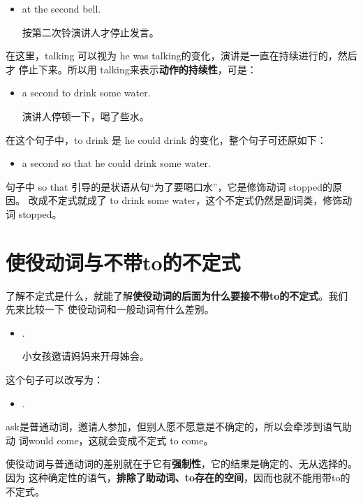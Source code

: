 \begin{itemize}
\item {}   at the second bell.

  按第二次铃演讲人才停止发言。
\end{itemize}
在这里，talking 可以视为 he was talking的变化，演讲是一直在持续进行的，然后才
停止下来。所以用 talking来表示\textbf{动作的持续性}，可是：

\begin{itemize}
\item {}  a second to drink some water.

演讲人停顿一下，喝了些水。
\end{itemize}
在这个句子中，to drink 是 he could drink 的变化，整个句子可还原如下：
\begin{itemize}
\item {}  a second so that he could
  drink some water.
\end{itemize}
句子中 so that 引导的是状语从句“为了要喝口水”，它是修饰动词 stopped的原因。
改成不定式就成了 to drink some water，这个不定式仍然是副词类，修饰动
词 stopped。

\section{使役动词与不带to的不定式}

了解不定式是什么，就能了解\textbf{使役动词的后面为什么要接不带to的不定式}。我们先来比较一下
使役动词和一般动词有什么差别。

\begin{itemize}
\item {}   .

  小女孩邀请妈妈来开母姊会。
\end{itemize}

这个句子可以改写为：

\begin{itemize}
\item  {}  .
\end{itemize}

ask是普通动词，邀请人参加，但别人愿不愿意是不确定的，所以会牵涉到语气助动
词would come，这就会变成不定式 to come。

使役动词与普通动词的差别就在于它有\textbf{强制性}，它的结果是确定的、无从选择的。因为
这种确定性的语气，\textbf{排除了助动词、to存在的空间}，因而也就不能用带to的不定式。

